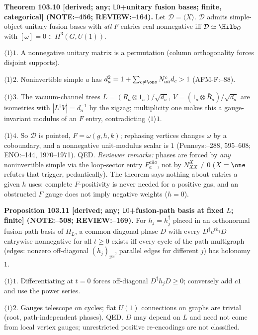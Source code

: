 \textbf{Theorem 103.10 [derived; any; \(\mathsf L0\)+unitary fusion bases; finite, categorical] (NOTE:--456; REVIEW:--164).}
Let \(\mathcal D=\langle X\rangle\). \(\mathcal D\) admits simple-object unitary fusion bases with \emph{all} \(F\) entries real nonnegative iff
\(\mathcal D\simeq\Hilb_G\) with \([\omega]=0\in H^3(G,U(1))\).
\par\(\langle1\rangle1\). A nonnegative unitary matrix is a permutation (column orthogonality forces disjoint supports).
\par\(\langle1\rangle2\). Noninvertible simple \(a\) has \(d_a^2=1+\sum_{c\ne\one}N^c_{a\bar a}d_c>1\) (AFM-F:--88).
\par\(\langle1\rangle3\). The vacuum-channel trees \(L=(R_a\otimes1_a)/\sqrt{d_a}\), \(V=(1_a\otimes\bar R_a)/\sqrt{d_a}\) are isometries with
\(|L^\dagger V|=d_a^{-1}\) by the zigzag; multiplicity one makes this a gauge-invariant modulus of an \(F\) entry, contradicting \(\langle1\rangle1\).
\par\(\langle1\rangle4\). So \(\mathcal D\) is pointed, \(F=\omega(g,h,k)\); rephasing vertices changes \(\omega\) by a coboundary, and a nonnegative
unit-modulus scalar is \(1\) (Penneys:--288, 595--608; ENO:--144, 1970--1971). QED.
\emph{Reviewer remarks:} phases are forced by \emph{any} noninvertible simple via the loop-sector entry \(F^{a\bar aa}_a\), not by
\(N_{XX}^X\neq0\) (\(X=\one\) refutes that trigger, pedantically). The theorem says nothing about entries a given \(h\) uses: complete
\(F\)-positivity is never needed for a positive gas, and an obstructed \(F\) gauge does not imply negative weights (\(h=0\)).

\textbf{Proposition 103.11 [derived; any; \(\mathsf L0\)+fusion-path basis at fixed \(L\); finite] (NOTE:--508; REVIEW:--169).}
For \(h_j=h_j^\dagger\) placed in an orthonormal fusion-path basis of \(H_L\), a common diagonal phase \(D\) with every \(D^\dagger e^{th_j}D\)
entrywise nonnegative for all \(t\ge0\) exists iff every cycle of the path multigraph (edges: nonzero off-diagonal \((h_j)_{yx}\), parallel
edges for different \(j\)) has holonomy \(1\).
\par\(\langle1\rangle1\). Differentiating at \(t=0\) forces off-diagonal \(D^\dagger h_jD\ge0\); conversely add \(c1\) and use the power series.
\par\(\langle1\rangle2\). Gauges telescope on cycles; flat \(U(1)\) connections on graphs are trivial (root, path-independent phases). QED.
\(D\) may depend on \(L\) and need not come from local vertex gauges; unrestricted positive re-encodings are not classified.

